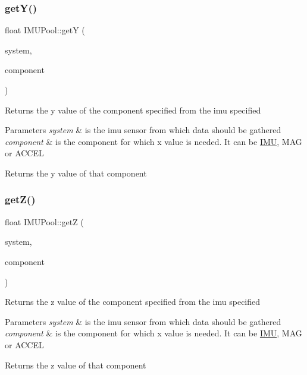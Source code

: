 \subsubsection{\texorpdfstring{get\+Y()}{getY()}}
{\footnotesize\ttfamily float I\+M\+U\+Pool\+::getY (\begin{DoxyParamCaption}\item[{unsigned int}]{system,  }\item[{imu\+\_\+comp}]{component }\end{DoxyParamCaption})}

Returns the y value of the component specified from the imu specified 
\begin{DoxyParams}{Parameters}
{\em system} & is the imu sensor from which data should be gathered \\
\hline
{\em component} & is the component for which x value is needed. It can be \hyperlink{class_i_m_u}{I\+MU}, M\+AG or A\+C\+C\+EL \\
\hline
\end{DoxyParams}
\begin{DoxyReturn}{Returns}
the y value of that component 
\end{DoxyReturn}
\mbox{\label{class_i_m_u_pool_a2e0f9ce0c95bbe4d9bd11c4fa06987b2}} 
\subsubsection{\texorpdfstring{get\+Z()}{getZ()}}
{\footnotesize\ttfamily float I\+M\+U\+Pool\+::getZ (\begin{DoxyParamCaption}\item[{unsigned int}]{system,  }\item[{imu\+\_\+comp}]{component }\end{DoxyParamCaption})}

Returns the z value of the component specified from the imu specified 
\begin{DoxyParams}{Parameters}
{\em system} & is the imu sensor from which data should be gathered \\
\hline
{\em component} & is the component for which x value is needed. It can be \hyperlink{class_i_m_u}{I\+MU}, M\+AG or A\+C\+C\+EL \\
\hline
\end{DoxyParams}
\begin{DoxyReturn}{Returns}
the z value of that component 
\end{DoxyReturn}
\mbox{\label{class_i_m_u_pool_a29487e0bed851336ec1b7682bdb3a8d2}} 
